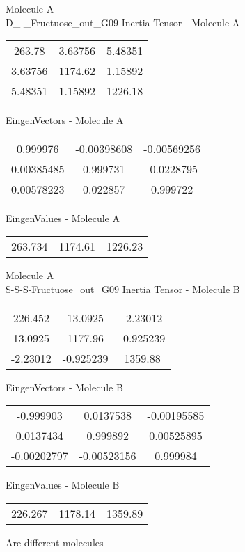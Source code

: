 \newpage
\begin{multicols}{2}
\begin{center}
Molecule A \\ 
D_-_Fructuose_out_G09
Inertia Tensor - Molecule A \\
\vtab
\begin{tabular}{|c c c|}
263.78	 & 	3.63756	 & 	5.48351	 \\
3.63756	 & 	1174.62	 & 	1.15892	 \\
5.48351	 & 	1.15892	 & 	1226.18
\end{tabular}

\vtab
 EingenVectors - Molecule A     \\
\vtab
\begin{tabular}{|c c c|}
0.999976	 & 	-0.00398608	 & 	-0.00569256	 \\
0.00385485	 & 	0.999731	 & 	-0.0228795	 \\
0.00578223	 & 	0.022857	 & 	0.999722
\end{tabular}

\vtab
 EingenValues - Molecule A     \\
\vtab
\begin{tabular}{|c c c|}
263.734	 & 	1174.61	 & 	1226.23
\end{tabular}
\columnbreak
Molecule A \\ 
S-S-S-Fructuose_out_G09
Inertia Tensor - Molecule B \\
\vtab
\begin{tabular}{|c c c|}
226.452	 & 	13.0925	 & 	-2.23012	 \\
13.0925	 & 	1177.96	 & 	-0.925239	 \\
-2.23012	 & 	-0.925239	 & 	1359.88
\end{tabular}

\vtab
 EingenVectors - Molecule B     \\
\vtab
\begin{tabular}{|c c c|}
-0.999903	 & 	0.0137538	 & 	-0.00195585	 \\
0.0137434	 & 	0.999892	 & 	0.00525895	 \\
-0.00202797	 & 	-0.00523156	 & 	0.999984
\end{tabular}

\vtab
 EingenValues - Molecule B     \\
\vtab
\begin{tabular}{|c c c|}
226.267	 & 	1178.14	 & 	1359.89
\end{tabular}
\textcolor{NavyBlue}{\large Are different molecules}
\end{center}
\end{multicols}
